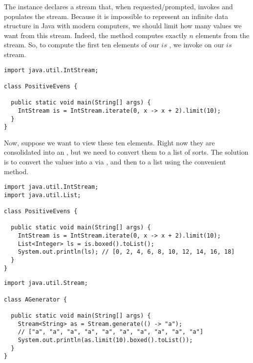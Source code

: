 The  instance declares a stream that, when requested/prompted, invokes and populates the stream. Because it is impossible to represent an infinite data structure in Java with modern computers, we should limit how many values we want from this stream. Indeed, the  method computes exactly $n$ elements from the stream. So, to compute the first ten elements of our $\textit{is}$ , we invoke  on our $\textit{is}$ stream. 

\begin{cl}[]{}
\begin{lstlisting}[language=MyJava]
import java.util.IntStream;

class PositiveEvens {
  
  public static void main(String[] args) {
    IntStream is = IntStream.iterate(0, x -> x + 2).limit(10);
  }
}
\end{lstlisting}
\end{cl}
Now, suppose we want to view these ten elements. Right now they are consolidated into an , but we need to convert them to a list of sorts. The solution is to convert the values into a  via , and then to a list using the convenient  method.
\begin{cl}[]{}
\begin{lstlisting}[language=MyJava]
import java.util.IntStream;
import java.util.List;

class PositiveEvens {
  
  public static void main(String[] args) {
    IntStream is = IntStream.iterate(0, x -> x + 2).limit(10);
    List<Integer> ls = is.boxed().toList();
    System.out.println(ls); // [0, 2, 4, 6, 8, 10, 12, 14, 16, 18]
  }
}
\end{lstlisting}
\end{cl}

\begin{cl}[]{}
\begin{lstlisting}[language=MyJava]
import java.util.Stream;

class AGenerator {

  public static void main(String[] args) {
    Stream<String> as = Stream.generate(() -> "a");
    // ["a", "a", "a", "a", "a", "a", "a", "a", "a", "a"]
    System.out.println(as.limit(10).boxed().toList()); 
  } 
}
\end{lstlisting}
\end{cl}

